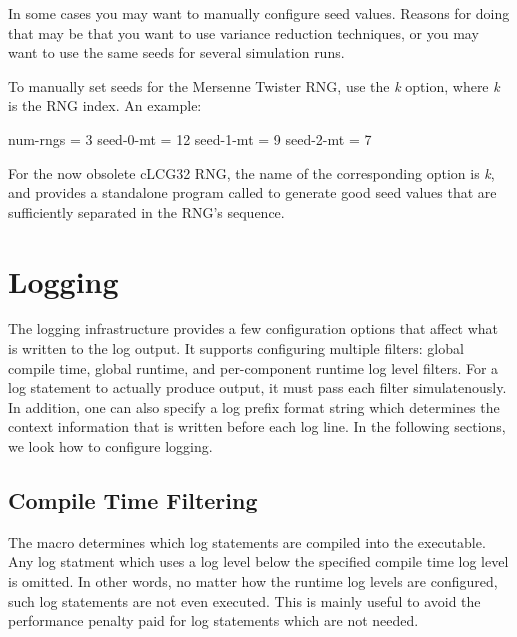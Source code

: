 In some cases you may want to manually configure seed values.
Reasons for doing that may be that you want to use variance reduction
techniques, or you may want to use the same seeds for several simulation
runs.

To manually set seeds for the Mersenne Twister RNG, use the \textit{k}
option, where \textit{k} is the RNG index. An example:

\begin{inifile}
[General]
num-rngs = 3
seed-0-mt = 12
seed-1-mt = 9
seed-2-mt = 7
\end{inifile}

\label{sec:config-sim:seedtool}

For the now obsolete cLCG32 RNG, the name of the corresponding option is
\textit{k}, and {\opp} provides a standalone program
called  to generate good seed values that
are sufficiently separated in the RNG's sequence.

\section{Logging}
\label{sec:config-sim:logging}

The {\opp} logging infrastructure provides a few configuration options that
affect what is written to the log output. It supports configuring multiple
filters: global compile time, global runtime, and per-component runtime log
level filters. For a log statement to actually produce output, it must pass
each filter simulatenously. In addition, one can also specify a log prefix
format string which determines the context information that is written before
each log line. In the following sections, we look how to configure logging.

\subsection{Compile Time Filtering}
\label{sec:config-sim:compile-time-log-filtering}

The  macro determines which log statements
are compiled into the executable. Any log statment which uses a log level below
the specified compile time log level is omitted. In other words, no matter how
the runtime log levels are configured, such log statements are not even executed.
This is mainly useful to avoid the performance penalty paid for log statements
which are not needed.

